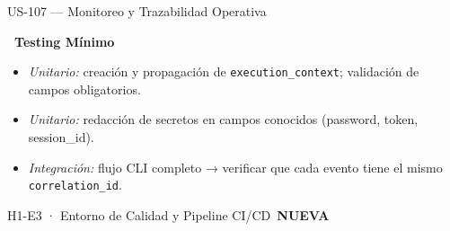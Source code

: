 \documentclass[11pt,a4paper]{article}
\newcommand{\fpath}[1]{\texttt{\small #1}}
\newcommand{\usfield}[2][\;]{%
  \par\vspace{5pt}%
  {\small\textbf{\textcolor{primary}{#2}}}\par\vspace{2pt}%
}
\newcommand{\tagnew}{\,\colorbox{tagnew}{\tiny\bfseries NUEVA}\,}
\begin{document}
\begin{uscard}{US-107 — Monitoreo y Trazabilidad Operativa}
\usfield{\faFlask\ Testing Mínimo}
\begin{itemize}[nosep, leftmargin=1.6em]
  \item \textit{Unitario:} creación y propagación de \fpath{execution\_context}; validación de campos obligatorios.
  \item \textit{Unitario:} redacción de secretos en campos conocidos (password, token, session\_id).
  \item \textit{Integración:} flujo CLI completo → verificar que cada evento tiene el mismo \fpath{correlation\_id}.
\end{itemize}

\end{uscard}

\begin{epicbox}{H1-E3 · Entorno de Calidad y Pipeline CI/CD \tagnew}
\end{epicbox}
\end{document}
